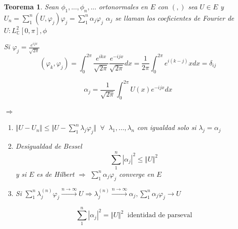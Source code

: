 \documentclass[a4paper,10pt]{book}
\newtheorem{theorem}{Teorema}
\begin{document}
\begin{theorem}
Sean $\phi_1,...,\phi_n,...$ ortonormales en $E$ con $(,)$
sea $U\in E$ y $ U_n = \sum\limits_1^n (U,\varphi_j) \varphi_j = \sum\limits_1^n \alpha_j \varphi_j$
$\alpha_j$ se llaman los coeficientes de Fourier de $U: L^2_{\mathbb{C}} [0,\pi ] , \phi $

Si $\varphi_j = \frac{ e^{ijx} } {\sqrt{2\pi}}$
\[
(\varphi_k,\varphi_j)= \int_0^{2\pi} \frac{e^{ikx}}{\sqrt{ 2\pi}} \frac{e^{-ijx}}{\sqrt{ 2\pi}} dx= \frac{1}{2\pi} \int_0^{2\pi} e^{i(k-j)}x dx = \delta_{ij}
\]

\[
\alpha_j=\frac{1}{\sqrt{2 \pi}} \int_0^{2\pi} U(x) e^{-ijx} dx
\]

$\Rightarrow$

\begin{enumerate}
    \item $\Vert U-U_n \Vert \leq \Vert U - \sum\limits_1^n \lambda_j \varphi_j \Vert \;\; \forall \;\; \lambda_1,\ldots, \lambda_n$ con igualdad solo si $\lambda_j= \alpha_j$



\item Desigualdad de Bessel  
\[
\sum_1^{n} |\alpha_j|^2 \leq \Vert U \Vert^2 
\]
y si $E$ es de Hilbert $\Rightarrow$  $\sum\limits_1^n \alpha_j \varphi_j$ converge en $E$ 

\item Si $\sum\limits_1^n \lambda_j^{(n)} \varphi_j  \overset{n\rightarrow \infty}{\longrightarrow }  U \Rightarrow  \lambda_j^{(n)}\overset{n\rightarrow \infty}{\longrightarrow }  \alpha_j , \sum\limits_1^n \alpha_j \varphi_j \rightarrow U  $

\[
\sum_1^{n} |\alpha_j|^2 =  \Vert U \Vert^2  \; \; \text{identidad de parseval}
\]
\end{enumerate}

\end{theorem}
\end{document}
